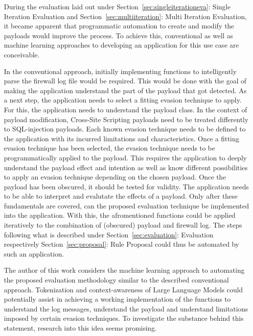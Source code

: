 During the evaluation laid out under Section~\ref{sec:singleiterationeva}: Single Iteration Evaluation and Section~\ref{sec:multiiteration}: Multi Iteration Evaluation, it became apparent that programmatic automation to create and modify the payloads would improve the process. To achieve this, conventional as well as machine learning approaches to developing an application for this use case are conceivable.

In the conventional approach, initially implementing functions to intelligently parse the firewall log file would be required. 
This would be done with the goal of making the application understand the part of the payload that got detected.
As a next step, the application needs to select a fitting evasion technique to apply. For this, the application needs to understand the payload class. In the context of payload modification, Cross-Site Scripting payloads need to be treated differently to SQL-injection payloads. 
Each known evasion technique needs to be defined to the application with its incurred limitations and characteristics. 
Once a fitting evasion technique has been selected, the evasion technique needs to be programmatically applied to the payload. 
This requires the application to deeply understand the payload effect and intention as well as know different possibilities to apply an evasion technique depending on the chosen payload. Once the payload has been obscured, it should be tested for validity. 
The application needs to be able to interpret and evalutate the effects of a payload. 
Only after these fundamentals are covered, can the proposed evaluation technique be implemented into the application. 
With this, the afromentioned functions could be applied iteratively to the combination of (obscured) payload and firewall log. 
The steps following what is described under Section~\ref{sec:evaluation}: Evaluation respectively Section~\ref{sec:proposal}: Rule Proposal could thus be automated by such an application.

The author of this work considers the machine learning approach to automating the proposed evaluation methodology similar to the described conventional approach.
Tokenization and context-awareness of Large Language Models could potentially assist in achieving a working implementation of the functions to understand the log messages, understand the payload and understand limitations imposed by certain evasion techniques. 
To investigate the substance behind this statement, research into this idea seems promising. 
